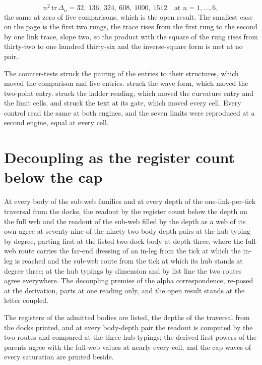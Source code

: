 \begin{chproof}[census]
\begin{equation}
n^{2}\,\mathrm{tr}\,\Delta_{n} = 32,\ 136,\ 324,\ 608,\ 1000,\ 1512 \quad\text{at } n = 1,\dots,6 ,
\end{equation}
the same at zero of five comparisons, which is the open result. The smallest case on the page is the first two rungs, the trace rises from the first rung to the second by one link trace, slope two, so the product with the square of the rung rises from thirty-two to one hundred thirty-six and the inverse-square form is met at no pair.

The counter-tests struck the pairing of the entries to their structures, which moved the comparison and five entries. struck the wave form, which moved the two-point entry. struck the ladder reading, which moved the curvature entry and the limit cells, and struck the text at its gate, which moved every cell. Every control read the same at both engines, and the seven limits were reproduced at a second engine, equal at every cell.
\end{chproof}
\section{Decoupling as the register count below the cap}\label{mod:I-6-D534954-w-dcpl}
\begin{chwall}\label{box:I-6-D534954-w-dcpl:1}
At every body of the sub-web families and at every depth of the one-link-per-tick traversal from the docks, the readout by the register count below the depth on the full web and the readout of the sub-web filled by the depth as a web of its own agree at seventy-nine of the ninety-two body-depth pairs at the hub typing by degree, parting first at the listed two-dock body at depth three, where the full-web route carries the far-end dressing of an in-leg from the tick at which the in-leg is reached and the sub-web route from the tick at which its hub stands at degree three; at the hub typings by dimension and by list line the two routes agree everywhere. The decoupling premise of the alpha correspondence, re-posed at the derivation, parts at one reading only, and the open result stands at the letter coupled.
\end{chwall}
The registers of the admitted bodies are listed, the depths of the traversal from the docks printed, and at every body-depth pair the readout is computed by the two routes and compared at the three hub typings; the derived first powers of the parents agree with the full-web values at nearly every cell, and the cap waves of every saturation are printed beside.

